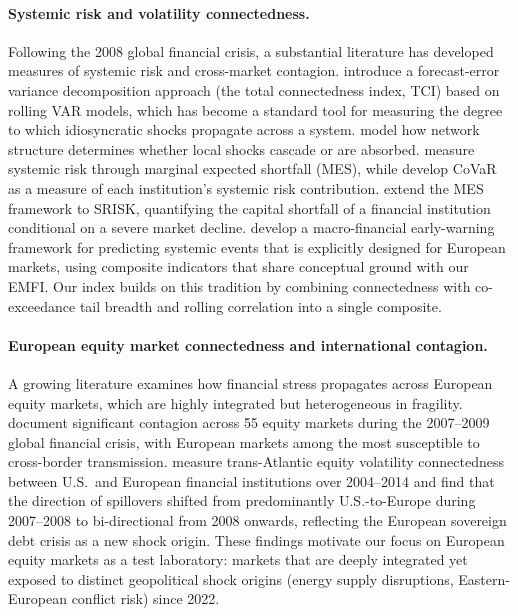 \documentclass[11pt]{article}
\begin{document}
\paragraph{Systemic risk and volatility connectedness.}
Following the 2008 global financial crisis, a substantial literature has
developed measures of systemic risk and cross-market contagion.
\citet{dieboldyilmaz2012} introduce a forecast-error variance decomposition
approach (the total connectedness index, TCI) based on rolling VAR models,
which has become a standard tool for measuring the degree to which
idiosyncratic shocks propagate across a system.
\citet{acemoglu2015systemic} model how network structure determines whether
local shocks cascade or are absorbed.
\citet{acharya2017} measure systemic risk through marginal expected shortfall
(MES), while \citet{adrian2016} develop CoVaR as a measure of each
institution's systemic risk contribution.
\citet{brownleesengle2017} extend the MES framework to SRISK, quantifying the
capital shortfall of a financial institution conditional on a severe market decline.
\citet{loducapeltonen2013} develop a macro-financial early-warning framework
for predicting systemic events that is explicitly designed for European markets,
using composite indicators that share conceptual ground with our EMFI.
Our index builds on this tradition by combining connectedness with
co-exceedance tail breadth and rolling correlation into a single composite.

\paragraph{European equity market connectedness and international contagion.}
A growing literature examines how financial stress propagates across European
equity markets, which are highly integrated but heterogeneous in fragility.
\citet{bekaert2014contagion} document significant contagion across 55 equity
markets during the 2007--2009 global financial crisis, with European markets
among the most susceptible to cross-border transmission.
\citet{dieboldyilmaz2016} measure trans-Atlantic equity volatility connectedness
between U.S.\ and European financial institutions over 2004--2014 and find
that the direction of spillovers shifted from predominantly U.S.-to-Europe
during 2007--2008 to bi-directional from 2008 onwards, reflecting the European
sovereign debt crisis as a new shock origin.
These findings motivate our focus on European equity markets as a test
laboratory: markets that are deeply integrated yet exposed to distinct
geopolitical shock origins (energy supply disruptions, Eastern-European
conflict risk) since 2022.
\end{document}
